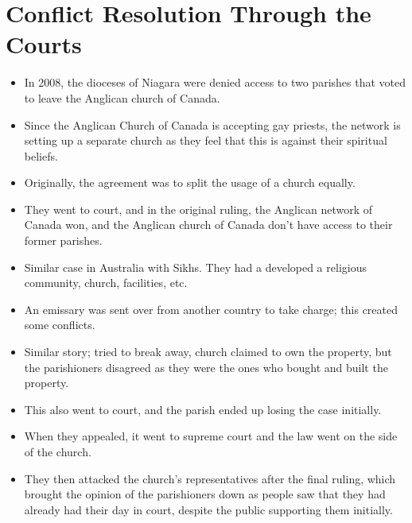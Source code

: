 \documentclass{article}
\begin{document}
\section{Conflict Resolution Through the Courts}
\begin{itemize}
    \item In 2008, the dioceses of Niagara were denied access to two parishes that voted to leave the Anglican church of Canada.
    \item Since the Anglican Church of Canada is accepting gay priests, the network is setting up a separate church as they feel that this is against their spiritual beliefs.
    \item Originally, the agreement was to split the usage of a church equally.
    \item They went to court, and in the original ruling, the Anglican network of Canada won, and the Anglican church of Canada don't have access to their former parishes.
    \item Similar case in Australia with Sikhs.  They had a developed a religious community, church, facilities, etc.
    \item An emissary was sent over from another country to take charge; this created some conflicts.
    \item Similar story; tried to break away, church claimed to own the property, but the parishioners disagreed as they were the ones who bought and built the property.
    \item This also went to court, and the parish ended up losing the case initially.
    \item When they appealed, it went to supreme court and the law went on the side of the church.
    \item They then attacked the church's representatives after the final ruling, which brought the opinion of the parishioners down as people saw that they had already had their day in court, despite the public supporting them initially.
\end{itemize}
\end{document}
